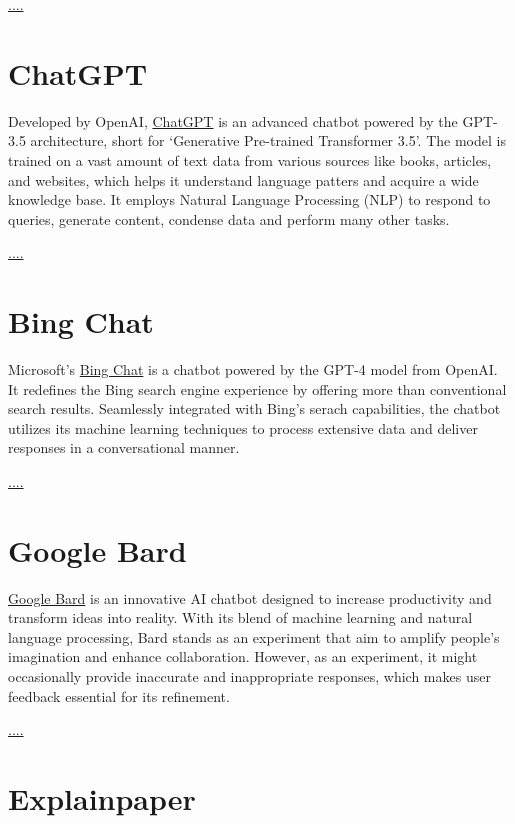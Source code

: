 \documentclass[
]{book}
\begin{document}
\url{....}

\hypertarget{chatgpt}{%
\section{ChatGPT}\label{chatgpt}}

Developed by OpenAI, \href{https://chat.openai.com/}{ChatGPT} is an advanced chatbot powered by the GPT-3.5 architecture, short for `Generative Pre-trained Transformer 3.5'. The model is trained on a vast amount of text data from various sources like books, articles, and websites, which helps it understand language patters and acquire a wide knowledge base. It employs Natural Language Processing (NLP) to respond to queries, generate content, condense data and perform many other tasks.

\url{....}

\hypertarget{bing-chat}{%
\section{Bing Chat}\label{bing-chat}}

Microsoft's \href{https://www.microsoft.com/en-us/edge/features/bing-chat?form=MT00D8}{Bing Chat} is a chatbot powered by the GPT-4 model from OpenAI. It redefines the Bing search engine experience by offering more than conventional search results. Seamlessly integrated with Bing's serach capabilities, the chatbot utilizes its machine learning techniques to process extensive data and deliver responses in a conversational manner.

\url{....}

\hypertarget{google-bard}{%
\section{Google Bard}\label{google-bard}}

\href{https://bard.google.com/}{Google Bard} is an innovative AI chatbot designed to increase productivity and transform ideas into reality. With its blend of machine learning and natural language processing, Bard stands as an experiment that aim to amplify people's imagination and enhance collaboration. However, as an experiment, it might occasionally provide inaccurate and inappropriate responses, which makes user feedback essential for its refinement.

\url{....}

\hypertarget{explainpaper}{%
\section{Explainpaper}\label{explainpaper}}
\end{document}
